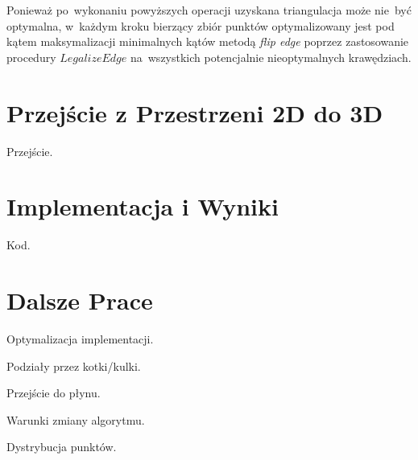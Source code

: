 \documentclass[skorowidz,autorrok,backref,xodstep,oswiadczenie]{wmimgr}
\begin{document}
Ponieważ po~wykonaniu powyższych operacji uzyskana triangulacja może nie~być optymalna, w~każdym kroku bierzący zbiór punktów optymalizowany jest pod kątem maksymalizacji minimalnych kątów metodą \emph{flip edge} poprzez zastosowanie procedury $LegalizeEdge$ na~wszystkich potencjalnie nieoptymalnych krawędziach.

\chapter{Przejście z Przestrzeni 2D do 3D}

Przejście.

\chapter{Implementacja i Wyniki}

Kod.

\chapter{Dalsze Prace}

Optymalizacja implementacji.

Podziały przez kotki/kulki.

Przejście do płynu.

Warunki zmiany algorytmu.

Dystrybucja punktów.

%

\end{document}
